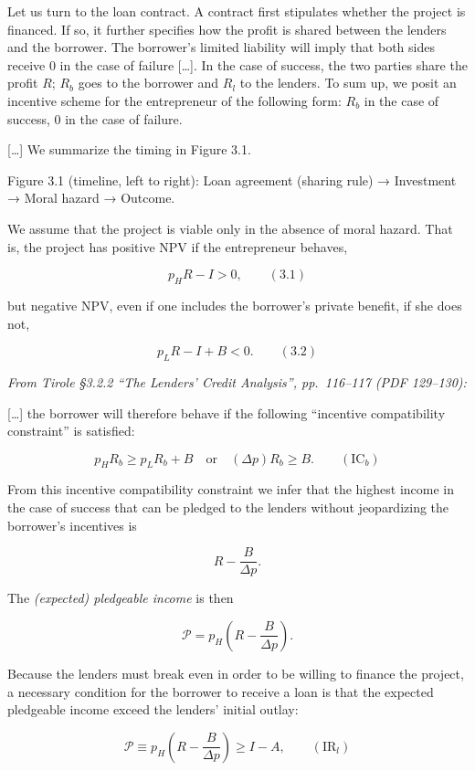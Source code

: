 \documentclass[11pt,a4paper]{article}
\begin{document}
Let us turn to the loan contract. A contract first stipulates whether the project is financed. If
so, it further specifies how the profit is shared between the lenders and the borrower. The
borrower's limited liability will imply that both sides receive 0 in the case of failure
{[}\ldots{]}. In the case of success, the two parties share the profit \(R\); \(R_b\) goes to the
borrower and \(R_l\) to the lenders. To sum up, we posit an incentive scheme for the entrepreneur of
the following form: \(R_b\) in the case of success, 0 in the case of failure.

{[}\ldots{]} We summarize the timing in Figure 3.1.

Figure 3.1 (timeline, left to right): Loan agreement (sharing rule) → Investment → Moral hazard →
Outcome.

We assume that the project is viable only in the absence of moral hazard. That is, the project has
positive NPV if the entrepreneur behaves,

\[p_H R - I > 0, \qquad (3.1)\]

but negative NPV, even if one includes the borrower's private benefit, if she does not,

\[p_L R - I + B < 0. \qquad (3.2)\]

\emph{From Tirole §3.2.2 ``The Lenders' Credit Analysis'', pp.~116--117 (PDF 129--130):}

{[}\ldots{]} the borrower will therefore behave if the following ``incentive compatibility
constraint'' is satisfied:

\[p_H R_b \geqslant p_L R_b + B \quad \text{or} \quad (\Delta p) R_b \geqslant B. \qquad (\text{IC}_b)\]

From this incentive compatibility constraint we infer that the highest income in the case of success
that can be pledged to the lenders without jeopardizing the borrower's incentives is

\[R - \frac{B}{\Delta p}.\]

The \emph{(expected) pledgeable income} is then

\[\mathcal{P} = p_H\left(R - \frac{B}{\Delta p}\right).\]

Because the lenders must break even in order to be willing to finance the project, a necessary
condition for the borrower to receive a loan is that the expected pledgeable income exceed the
lenders' initial outlay:

\[\mathcal{P} \equiv p_H\left(R - \frac{B}{\Delta p}\right) \geqslant I - A, \qquad (\text{IR}_l)\]
\end{document}

